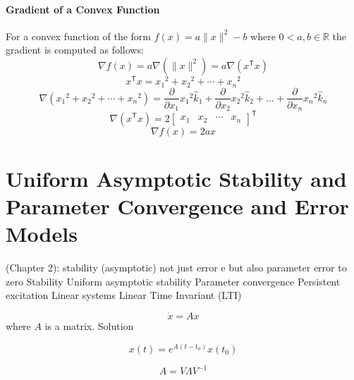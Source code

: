 \subsubsection{Gradient of a Convex Function}

For a convex function of the form $f(x)=a\|x\|^{2}-b$ where $0<a,b\in\mathbb{R}$ the gradient is computed as follows:
\begin{equation*}
  \nabla f(x)=a\nabla\left(\|x\|^{2}\right)=a\nabla(x^{\mathsf{T}}x)
\end{equation*}
\begin{equation*}
  x^{\mathsf{T}}x={x_{1}}^{2}+{x_{2}}^{2}+\cdots+{x_{n}}^{2}
\end{equation*}
\begin{equation*}
  \nabla({x_{1}}^{2}+{x_{2}}^{2}+\cdots+{x_{n}}^{2})=
  \frac{\partial}{\partial{}x_{1}}{x_{1}}^{2}\hat{k}_{1}+
  \frac{\partial}{\partial{}x_{2}}{x_{2}}^{2}\hat{k}_{2}+
  \dots+
  \frac{\partial}{\partial{}x_{n}}{x_{n}}^{2}\hat{k}_{n}
\end{equation*}
\begin{equation*}
  \nabla(x^{\mathsf{T}}x)=2
  \begin{bmatrix}
    x_{1} & x_{2} & \cdots & x_{n}
  \end{bmatrix}^{\mathsf{T}}
\end{equation*}
\begin{equation*}
  \nabla f(x)=2ax
\end{equation*}

\chapter{Uniform Asymptotic Stability and Parameter Convergence and Error Models}

(Chapter 2):
stability (asymptotic) not just error e but also parameter error to zero
Stability
Uniform asymptotic stability
Parameter convergence
Persistent excitation
Linear systems
Linear Time Invariant (LTI)

\begin{equation*}
  \dot{x}=Ax
\end{equation*}
where $A$ is a matrix.
Solution

\begin{equation*}
  x(t)=e^{A(t-t_{0})}x(t_{0})
\end{equation*}

\begin{equation*}
  A=V\Lambda V^{-1}
\end{equation*}

